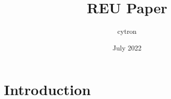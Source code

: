 \documentclass{article}
\title{REU Paper}
\author{cytron }
\date{July 2022}
\begin{document}
\maketitle

\section{Introduction}
\end{document}
